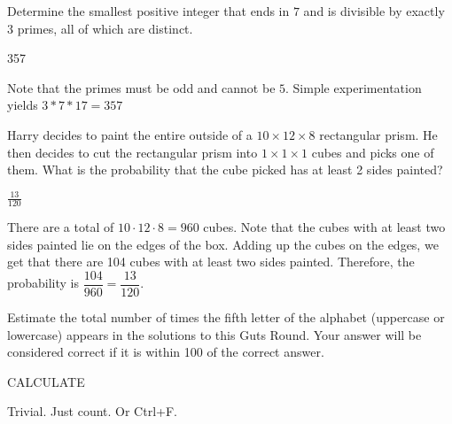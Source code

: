\documentclass[11pt]{article}
\begin{document}
\begin{problem}
Determine the smallest positive integer that ends in $7$ and is divisible by exactly 3 primes, all of which are distinct.
\end{problem}

\begin{answer}
357
\end{answer}

\begin{solution}
Note that the primes must be odd and cannot be $5$. Simple experimentation yields $3*7*17 = 357$
\end{solution}


\begin{problem}
Harry decides to paint the entire outside of a $10 \times 12 \times 8$ rectangular prism. He then decides to cut the rectangular prism into $1 \times 1 \times 1$ cubes and picks one of them. What is the probability that the cube picked has at least 2 sides painted? 
\end{problem}

\begin{answer}
$\frac{13}{120}$
\end{answer}

\begin{solution}
There are a total of $10 \cdot 12 \cdot 8 = 960$ cubes. Note that the cubes with at least two sides painted lie on the edges of the box. Adding up the cubes on the edges, we get that there are 104 cubes with at least two sides painted. Therefore, the probability is $\dfrac{104}{960} = \dfrac{13}{120}$.
\end{solution}
 

\begin{problem}
Estimate the total number of times the fifth letter of the alphabet (uppercase or lowercase) appears in the solutions to this Guts Round. Your answer will be considered correct if it is within 100 of the correct answer.
\end{problem}

\begin{answer}
CALCULATE
\end{answer}

\begin{solution}
Trivial. Just count. Or Ctrl+F.
\end{solution}
\end{document}
